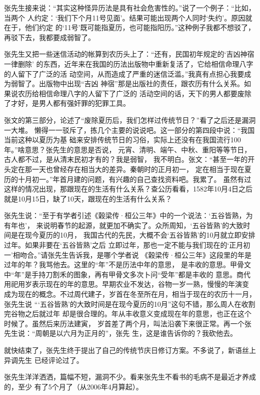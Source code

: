 张先生接来说：“其实这种怪异历法是具有社会危害性的。”说了一个例子：“比如，当两个
人约定：‘我们下个月11号见面’。结果可能出现两个人同时‘失约’。原因就在于，他们约定
的‘11号’既可能指夏历，也可能指阳历。”这种例子我都不想驳了，再驳下去，我都要成弱智了。

张先生又把一些迷信活动的帐算到农历头上了：“还有，民国初年规定的‘吉凶神宿一律删除’
的东西，近年来在我国的历法出版物中重新复活了，它给相信命理八字的人留下了广泛的活
动空间，从而造成了严重的迷信泛滥。”我真有点担心我要成为弱智了。出版物中出现“吉凶
神宿”那是出版社的责任，跟农历有什么关系。如果说农历给相信命理八字的人留下了广泛的
活动空间的话，天下的男人都要废除了才好，是男人都有强奸罪的犯罪工具。

张文的第三部分，论述了“废除夏历后，我们怎样过传统节日？”看了之后还是漏洞一大堆。
懒得一一驳斥了，拣几个主要的说说吧。这一部分的第四段中说：“我国当前这种以夏历为基
础来安排传统节日的习俗，实际上还没有在我国流行100年。”啥意思？张先生的意思是否说，
元宵、清明、端午、中秋、重阳等等节日，古人都不过，是从清末民初才有的？我是弱智，
我不明白。张文：“甚至一年的开头定在那一天也曾经存在相当大的差异。秦朝时的正月初一，
定在相当于现在夏历的十月初一。”年首月建的问题，有兴趣的自己查找资料吧。我累了。
虽然有过这样的情况出现，那跟现在的生活有什么关系？查公历看看，1582年10月4日之后
就是10月15日，缺了10天，跟现在的生活有什么关系？

张先生说：“至于有学者引述《榖梁传·桓公三年》中的一个说法：‘五谷皆熟，为有年也’，
来说明春节的起源，就更加不确实了。众所周知，‘五谷皆熟’的大致时间是在现今夏历的10月，
我国古代的先民，大概不会‘五谷皆熟’的10月就立即安排过年。如果非要在‘五谷皆熟’之后
立即过年，那也一定不能与我们现在的‘正月初一’相吻合。”请张先生告诉我，是哪个学者说
《榖梁传·桓公三年》这段里的年是过年的年？我骂他去。这里的“年”不是历法中年的意思，
是丰收的意思。甲骨文中“年”是手持刀割禾的图象，再有甲骨文多次卜问“受年”都是丰收的
意思。商代用祀用岁表示现在的年的意思。早期农业不发达，谷物一岁一熟，慢慢的年演变
成为现在的概念。不过周代建子，岁首在冬至所在月，相当于现在的农历十一月，张先生说
“‘五谷皆熟’的大致时间是在现今夏历的10月”这句不错，那么周人在收割完谷物之后就过年
却是很合理的。年从丰收意义变成现在年的意思，也正在这个时候了。虽然后来历法建寅，
岁首差了两个月，叫法沿袭下来很正常。再一个张先生说：“周朝是以六月为正月的”，张先
生，这是谁告诉你的？我砍他去。

就快结束了，张先生终于提出了自己的传统节庆日修订方案。不多说了，新语丝上异调先生
已经评论过了。

张先生洋洋洒洒，篇幅不短，漏洞不少。看来张先生不看书的毛病不是最近才养成的，至少
有了5个月了（从2006年4月算起）。
